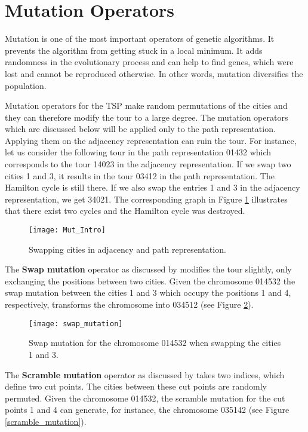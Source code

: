 \section{Mutation Operators}
\label{sec:mutation}
Mutation is one of the most important operators of genetic algorithms. It prevents the algorithm from getting stuck in a local minimum. It adds randomness in the evolutionary process and can help to find genes, which were lost and cannot be reproduced otherwise. In other words, mutation diversifies the population.\par
Mutation operators for the TSP make random permutations of the cities and they can therefore modify the tour to a large degree. The mutation operators which are discussed below will be applied only to the path representation. Applying them on the adjacency representation can ruin the tour. For instance, let us consider the following tour in the path representation 01432 which corresponds to the tour 14023 in the adjacency representation. If we swap two cities 1 and 3, it results in the tour 03412 in the path representation. The Hamilton cycle is still there. If we also swap the entries 1 and 3 in the adjacency representation, we get 34021. The corresponding graph in Figure \ref{mut_intro} illustrates that there exist two cycles and the Hamilton cycle was destroyed. \par

\begin{figure}[htp] \centering
	\centering
	\texttt{[image: Mut\_Intro]}
	\caption{Swapping cities in adjacency and path representation.}
	\label{mut_intro}
\end{figure}

The \textbf{Swap mutation} operator as discussed by \citeauthor{potvin1996genetic} \cite{potvin1996genetic} modifies the tour slightly, only exchanging the positions between two cities. Given the chromosome 014532 the swap mutation between the cities 1 and 3 which occupy the positions 1 and 4, respectively, transforms the chromosome into 034512 (see Figure \ref{swap_mutation}).

\begin{figure}[htp] \centering
	\centering
	\texttt{[image: swap\_mutation]}
	\caption{Swap mutation for the chromosome 014532 when swapping the cities 1 and 3.}
	\label{swap_mutation}
\end{figure}


The \textbf{Scramble mutation} operator as discussed by \citeauthor{potvin1996genetic} \cite{potvin1996genetic} takes two indices, which define two cut points. The cities between these cut points are randomly permuted. Given the chromosome 014532, the scramble mutation for the cut points 1 and 4 can generate, for instance, the chromosome 035142 (see Figure \ref{scramble_mutation}).

